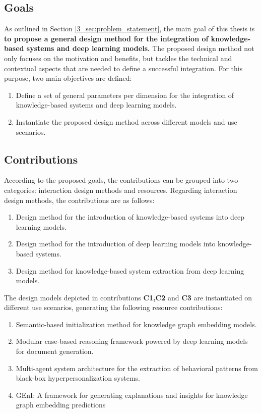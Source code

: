 \subsection{Goals}
As outlined in Section \ref{3_sec:problem_statement}, the main goal of this thesis is \textbf{to propose a general design method for the integration of knowledge-based systems and deep learning models.}  The proposed design method not only focuses on the motivation and benefits, but tackles the technical and contextual aspects that are needed to define a successful integration. For this purpose, two main objectives are defined:
\begin{enumerate}[start=1,label={\bfseries O\arabic*:}]
    \item Define a set of general parameters per dimension for the integration of knowledge-based systems and deep learning models.
    \item Instantiate the proposed design method across different models and use scenarios.
\end{enumerate}

\subsection{Contributions}
According to the proposed goals, the contributions can be grouped into two categories: interaction design methods and resources.
Regarding interaction design methods, the contributions are as follows:
\begin{enumerate}[start=1,label={\bfseries C\arabic*:}]
    \item Design method for the introduction of knowledge-based systems into deep learning models.
    \item Design method for the introduction of deep learning models into knowledge-based systems.
    \item Design method for knowledge-based system extraction from deep learning models.
\end{enumerate}
The design models depicted in contributions \textbf{C1,C2} and \textbf{C3} are instantiated on different use scenarios, generating the following resource contributions:
\begin{enumerate}[start=4,label={\bfseries C\arabic*:}]
    \item Semantic-based initialization method for knowledge graph embedding models.
    \item Modular case-based reasoning framework powered by deep learning models for document generation.
    \item Multi-agent system architecture for the extraction of behavioral patterns from black-box hyperpersonalization systems.
    \item GEnI: A framework for generating explanations and insights for knowledge graph embedding predictions
\end{enumerate}
